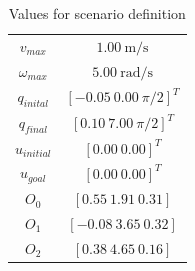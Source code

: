\documentclass[eprint]{actapoly}
\begin{document}
\begin{table}[H]
\caption {Values for scenario definition} \label{tab:s3param}
\begin{center}
\begin{tabular}{c|c}
$v_{max}$ & $1.00\ \mathrm{m/s}$\\[4pt]
$\omega_{max}$ & $5.00\ \mathrm{rad/s}$\\[4pt]
$q_{inital}$ & $[-0.05\ 0.00\ \pi/2]^T$\\[4pt]
$q_{final}$ & $[0.10\ 7.00\ \pi/2]^T$\\[4pt]
$u_{initial}$ & $[0.00\ 0.00]^T$\\[4pt]
$u_{goal}$ & $[0.00\ 0.00]^T$\\[4pt]
$O_0$ & $[0.55\ 1.91\ 0.31]$\\[4pt]
$O_1$ & $[-0.08\ 3.65\ 0.32]$\\[4pt]
$O_2$ & $[0.38\ 4.65\ 0.16]$
\end{tabular}
\end{center}
\end{table}
\end{document}
